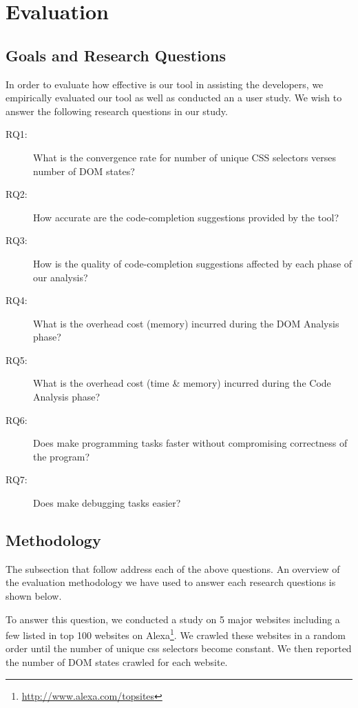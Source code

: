 \section{Evaluation}
\label{Sec:Evaluation}

	\subsection{Goals and Research Questions}
	\label{Sec:Goals}
	In order to evaluate how effective is our tool in assisting the developers, we empirically evaluated our tool as well as conducted an a user study. We wish to answer the following research questions in our study.
	\begin{description}
		\item[RQ1:] What is the convergence rate for number of unique CSS selectors verses number of DOM states?
		\item[RQ2:] How accurate are the code-completion suggestions provided by the tool?
		\item[RQ3:] How is the quality of code-completion suggestions affected by each phase of our analysis?
		\item[RQ4:] What is the overhead cost (memory) incurred during the DOM Analysis phase?
		\item[RQ5:] What is the overhead cost (time \& memory) incurred during the  Code Analysis phase?
		\item[RQ6:] Does \dompletion make programming tasks faster without compromising correctness of the program?
		\item[RQ7:] Does \dompletion make debugging tasks easier?
	\end{description}
	
	\subsection{Methodology}
	\label{Sec:Methodology}
	The subsection that follow address each of the above questions. An overview of the evaluation methodology we have used to answer each research questions is shown below.
	
	 To answer this question, we conducted a study on 5 major websites including a few listed in top 100 websites on Alexa\footnote{\url{http://www.alexa.com/topsites}}. We crawled these websites in a random order until the number of unique css selectors become constant.  We then reported the number of DOM states crawled for each website.
	
